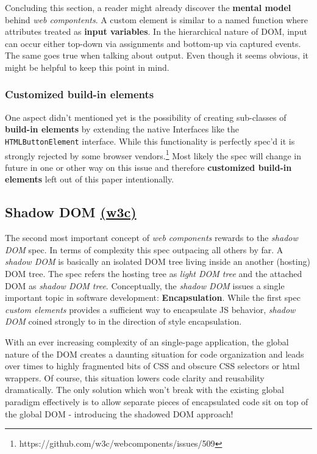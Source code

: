 \documentclass[]{assets/latex/ieee}
\begin{document}
Concluding this section, a reader might already discover the
\textbf{mental model} behind \emph{web compontents}. A custom element is
similar to a named function where attributes treated as \textbf{input
variables}. In the hierarchical nature of DOM, input can occur either
top-down via assignments and bottom-up via captured events. The same
goes true when talking about output. Even though it seems obvious, it
might be helpful to keep this point in mind.

\subsubsection{Customized build-in
elements}\label{customized-build-in-elements}

One aspect didn't mentioned yet is the possibility of creating
sub-classes of \textbf{build-in elements} by extending the native
Interfaces like the \texttt{HTMLButtonElement} interface. While this
functionality is perfectly spec'd it is strongly rejected by some
browser vendors.\footnote{https://github.com/w3c/webcomponents/issues/509}
Most likely the spec will change in future in one or other way on this
issue and therefore \textbf{customized build-in elements} left out of
this paper intentionally.

\subsection{\texorpdfstring{Shadow DOM
\href{http://w3c.github.io/webcomponents/spec/shadow/}{(w3c)}}{Shadow DOM (w3c)}}\label{shadow-dom-w3c}

The second most important concept of \emph{web components} rewards to
the \emph{shadow DOM} spec. In terms of complexity this spec outpacing
all others by far. A \emph{shadow DOM} is basically an isolated DOM tree
living inside an another (hosting) DOM tree. The spec refers the hosting
tree as \emph{light DOM tree} and the attached DOM as \emph{shadow DOM
tree}. Conceptually, the \emph{shadow DOM} issues a single important
topic in software development: \textbf{Encapsulation}. While the first
spec \emph{custom elements} provides a sufficient way to encapsulate JS
behavior, \emph{shadow DOM} coined strongly to in the direction of style
encapsulation.

With an ever increasing complexity of an single-page application, the
global nature of the DOM creates a daunting situation for code
organization and leads over times to highly fragmented bits of CSS and
obscure CSS selectors or html wrappers. Of course, this situation lowers
code clarity and reusability dramatically. The only solution which won't
break with the existing global paradigm effectively is to allow separate
pieces of encapsulated code sit on top of the global DOM - introducing
the shadowed DOM approach!
\end{document}

